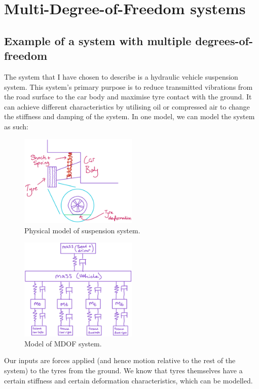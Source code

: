 \documentclass[11pt]{article}
\numberwithin{equation}{section}
\begin{document}
\section{Multi-Degree-of-Freedom systems}
\subsection{Example of a system with multiple degrees-of-freedom}
The system that I have chosen to describe is a hydraulic vehicle suspension system. This system's primary purpose is to reduce transmitted vibrations from the road surface to the car body and maximise tyre contact with the ground. It can achieve different characteristics by utilising oil or compressed air to change the stiffness and damping of the system. In one model, we can model the system as such:
\begin{figure}[H]
    \centering
    \includegraphics[width = 0.5\textwidth]{./img/q61.png}
    \caption{Physical model of suspension system.}
    \label{q61}
\end{figure}
\begin{figure}[H]
    \centering
    \includegraphics[width = 0.5\textwidth]{./img/q62.png}
    \caption{Model of MDOF system.}
    \label{q62}
\end{figure}
Our inputs are forces applied (and hence motion relative to the rest of the system) to the tyres from the ground. We know that tyres themselves have a certain stiffness and certain deformation characteristics, which can be modelled.
\end{document}
